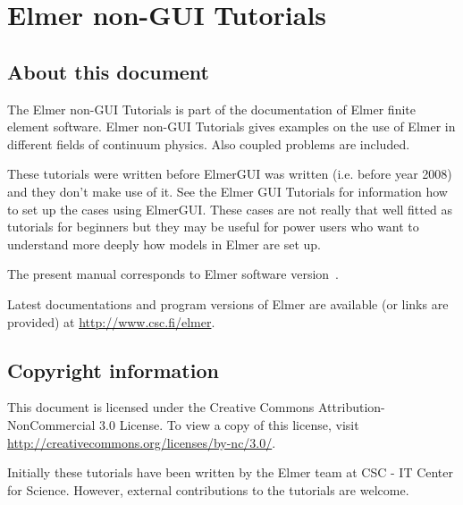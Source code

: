 \chapter*{Elmer non-GUI Tutorials}

\section*{About this document}

The Elmer non-GUI Tutorials is part of the documentation of Elmer finite element software.
Elmer non-GUI Tutorials gives examples on the use of Elmer in different fields
of continuum physics. Also coupled problems are included. 

These tutorials were written before ElmerGUI was written (i.e. before year 2008) and 
they don't make use of it. 
See the Elmer GUI Tutorials for information how to set up the cases using ElmerGUI.
These cases are not really that well fitted as tutorials for beginners but they may be useful 
for power users who want to understand more deeply how models in Elmer are set up. 

The present manual corresponds to Elmer software version~\elmerversion{}.

Latest documentations and program versions of Elmer are available (or links are provided) at 
\url{http://www.csc.fi/elmer}. 

\section*{Copyright information}

This document is licensed under the Creative Commons Attribution-NonCommercial 3.0 License. 
To view a copy of this license, visit \url{http://creativecommons.org/licenses/by-nc/3.0/}.

Initially these tutorials have been written by the Elmer team at CSC - IT Center for Science. 
However, external contributions to the tutorials are welcome. 

